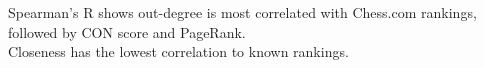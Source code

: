 \documentclass[preview]{standalone}
\begin{document}
Spearman's R shows out-degree is most correlated with Chess.com rankings, followed by CON score and PageRank.\\Closeness has the lowest correlation to known rankings.\\
\end{document}
